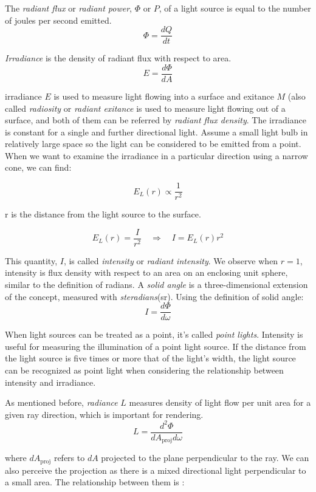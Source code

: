 \documentclass[10pt, a4paper]{article}
\begin{document}
        The \emph{radiant flux} or \emph{radiant power}, $\Phi$ or $P$, of a light source is equal to the number of joules per second emitted.
        $$\Phi = \frac{dQ}{dt}$$

        \emph{Irradiance} is the density of radiant flux with respect to area.
        $$E = \frac{d\Phi}{dA}$$

        irradiance $E$ is used to measure light flowing into a surface and exitance $M$ (also called \emph{radiosity} or \emph{radiant exitance} is used to measure light flowing out of a surface, and both of them can be referred by \emph{radiant flux density}. The irradiance is constant for a single and further directional light. Assume a small light bulb in relatively large space so the light can be considered to be emitted from a point. When we want to examine the irradiance in a particular direction using a narrow cone, we can find: 

        $$E_L(r) \propto \frac{1}{r^2}$$

        r is the distance from the light source to the surface. 

        $$E_L(r) = \frac{I}{r^2} \quad \Rightarrow \quad I = E_L(r)r^2$$

        This quantity, $I$, is called \emph{intensity} or \emph{radiant intensity}. We observe when $r = 1$, intensity is flux density with respect to an area on an enclosing unit sphere, similar to the definition of radians. A \emph{solid angle} is a three-dimensional extension of the concept,  measured with \emph{steradians}(sr). Using the definition of solid angle:
        $$I = \frac{d\Phi}{d\omega}$$

        When light sources can be treated  as a point, it's called \emph{point lights}. Intensity is useful for measuring the illumination of a point light source. If the distance from the light source is five times or more that of the light's width, the light source can be recognized as point light when considering the relationship between intensity  and irradiance.
        
        As mentioned before, \emph{radiance} $L$ measures density of light flow per unit area for a given ray direction, which is important  for rendering. 
        $$L = \frac{d^2\Phi}{dA_{\text{proj}}d\omega}$$

        where $dA_{\text{proj}}$ refers to $dA$ projected to the plane perpendicular to the ray. We can also perceive the projection as there is a mixed directional light perpendicular to a small area. The relationship between them is : 
\end{document}
